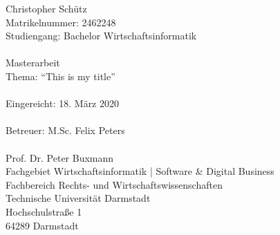 %
%
%
%
\vspace*{\fill}
\singlespacing 
\noindent Christopher Schütz \\
Matrikelnummer: 2462248 \\
Studiengang: Bachelor Wirtschaftsinformatik \\\\
Masterarbeit \\
Thema: ``This is my title'' \\\\
Eingereicht: 18. März 2020 \\\\
Betreuer: M.Sc. Felix Peters \\\\
Prof. Dr. Peter Buxmann \\
Fachgebiet Wirtschaftsinformatik | Software \& Digital Business \\
Fachbereich Rechts- und Wirtschaftswissenschaften \\
Technische Universität Darmstadt \\
Hochschulstraße 1 \\
64289 Darmstadt \\

\onehalfspacing

\setcounter{page}{2}

